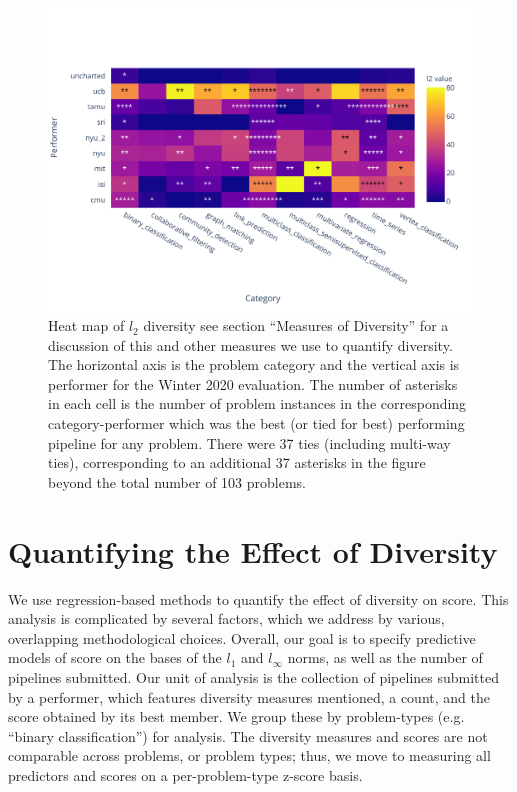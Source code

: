 \documentclass{article}
\begin{document}
\begin{figure}
\centering
\includegraphics[scale=1.3]{heatmap.pdf}
\caption{Heat map of $l_2$ diversity see section ``Measures of
  Diversity'' for a discussion of this and other measures we use to
  quantify diversity.  The horizontal axis is the problem category and
  the vertical axis is performer for the Winter 2020 evaluation.  The
  number of asterisks in each cell is the number of problem instances
  in the corresponding category-performer which was the best (or tied
  for best) performing pipeline for any problem.  There were 37 ties
  (including multi-way ties), corresponding to an additional 37
  asterisks in the figure beyond the total number of 103 problems.}
\label{fig:heatmap}
\end{figure}

\section{Quantifying the Effect of Diversity}
\label{sec:quantifying}
We use regression-based methods to quantify the effect of diversity on
score. This analysis is complicated by several factors, which we
address by various, overlapping methodological choices. Overall, our
goal is to specify predictive models of score on the bases of the
$l_1$ and $l_\infty$ norms, as well as the number of pipelines
submitted. Our unit of analysis is the collection of pipelines
submitted by a performer, which features diversity measures mentioned,
a count, and the score obtained by its best member. We group these by
problem-types (e.g. ``binary classification'') for analysis. The
diversity measures and scores are not comparable across problems, or
problem types; thus, we move to measuring all predictors and scores on
a per-problem-type z-score basis.
\end{document}
